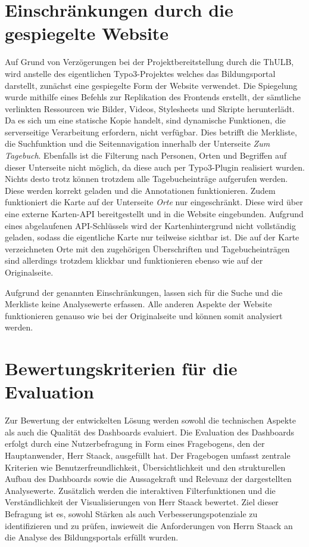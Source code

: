 \section{Einschränkungen durch die gespiegelte Website}
\label{sec:einschränkungen }
Auf Grund von Verzögerungen bei der Projektbereitstellung durch die ThULB, wird anstelle des eigentlichen Typo3-Projektes welches das Bildungsportal darstellt, zunächst eine gespiegelte Form der Website verwendet. Die Spiegelung wurde mithilfe eines Befehls zur Replikation des Frontends erstellt, der sämtliche verlinkten Ressourcen wie Bilder, Videos, Stylesheets und Skripte herunterlädt. Da es sich um eine statische Kopie handelt, sind dynamische Funktionen, die serverseitige Verarbeitung erfordern, nicht verfügbar. Dies betrifft die Merkliste, die Suchfunktion und die Seitennavigation innerhalb der Unterseite \textit{Zum Tagebuch}. Ebenfalls ist die Filterung nach Personen, Orten und Begriffen auf dieser Unterseite nicht möglich, da diese auch per Typo3-Plugin realisiert wurden. Nichts desto trotz können trotzdem alle Tagebucheinträge aufgerufen werden. Diese werden korrekt geladen und die Annotationen funktionieren. Zudem funktioniert die Karte auf der Unterseite \textit{Orte} nur eingeschränkt. Diese wird über eine externe Karten-API bereitgestellt und in die Website eingebunden. Aufgrund eines abgelaufenen API-Schlüssels wird der Kartenhintergrund nicht vollständig geladen, sodass die eigentliche Karte nur teilweise sichtbar ist. Die auf der Karte verzeichneten Orte mit den zugehörigen Überschriften und Tagebucheinträgen sind allerdings trotzdem klickbar und funktionieren ebenso wie auf der Originalseite. 

Aufgrund der genannten Einschränkungen, lassen sich für die Suche und die Merkliste keine Analysewerte erfassen. Alle anderen Aspekte der Website funktionieren genauso wie bei der Originalseite und können somit analysiert werden.

\section{Bewertungskriterien für die Evaluation}
\label{sec:bewertungskriterien}
Zur Bewertung der entwickelten Lösung werden sowohl die technischen Aspekte als auch die Qualität des Dashboards evaluiert. Die Evaluation des Dashboards erfolgt durch eine Nutzerbefragung in Form eines Fragebogens, den der Hauptanwender, Herr Staack, ausgefüllt hat. Der Fragebogen umfasst zentrale Kriterien wie Benutzerfreundlichkeit, Übersichtlichkeit und den strukturellen Aufbau des Dashboards sowie die Aussagekraft und Relevanz der dargestellten Analysewerte. Zusätzlich werden die interaktiven Filterfunktionen und die Verständlichkeit der Visualisierungen von Herr Staack bewertet. Ziel dieser Befragung ist es, sowohl Stärken als auch Verbesserungspotenziale zu identifizieren und zu prüfen, inwieweit die Anforderungen von Herrn Staack an die Analyse des Bildungsportals erfüllt wurden.

